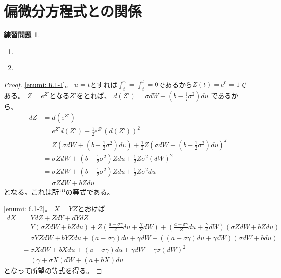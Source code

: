 \documentclass[uplatex]{jsarticle}
\theoremstyle{definition}
\newtheorem{prob}[prob]{練習問題}
\begin{document}
\newpage

\section{偏微分方程式との関係}\label{section: 6}



\begin{prob}\label{prob: 6.1}
  \begin{enumerate}
    \item \label{enumi: 6.1-1}
    \item \label{enumi: 6.1-2}
  \end{enumerate}
\end{prob}

\begin{proof}
  \ref{enumi: 6.1-1}。
  \(u=t\)とすれば\(\int_t^u=\int_t^t=0\)であるから\(Z(t)=e^0=1\)である。
  \(Z=e^{Z'}\)となる\(Z'\)をとれば、
  \(d(Z') = \sigma dW + \left( b-\frac{1}{2}\sigma^2\right) du\)
  であるから、
  \begin{align*}
    dZ &= d(e^{Z'}) \\
    &= e^{Z'}d(Z') + \frac{1}{2}e^{Z'} (d(Z'))^2 \\
    &= Z\left( \sigma dW + \left( b-\frac{1}{2}\sigma^2\right) du \right)
    + \frac{1}{2}Z\left( \sigma dW
    + \left( b-\frac{1}{2}\sigma^2\right) du \right)^2 \\
    &= \sigma Z dW + \left( b-\frac{1}{2}\sigma^2\right) Zdu
    + \frac{1}{2}Z\sigma^2(dW)^2 \\
    &= \sigma Z dW + \left( b-\frac{1}{2}\sigma^2\right) Zdu
    + \frac{1}{2}Z\sigma^2du \\
    &= \sigma ZdW + bZ du
  \end{align*}
  となる。これは所望の等式である。

  \ref{enumi: 6.1-2}。
  \(X=YZ\)とおけば
  \begin{align*}
    dX &= YdZ + ZdY + dYdZ \\
    &= Y\left( \sigma ZdW + bZ du \right)
    + Z\left( \frac{a-\sigma\gamma}{Z}du + \frac{\gamma}{Z}dW \right)
    + \left( \frac{a-\sigma\gamma}{Z}du + \frac{\gamma}{Z}dW \right)
    \left( \sigma ZdW + bZ du \right) \\
    &= \sigma YZdW + bYZ du
    + \left(a-\sigma\gamma\right) du + \gamma dW
    + \left( \left(a-\sigma\gamma \right)du + \gamma dW \right)
    \left( \sigma dW + b du \right) \\
    &= \sigma XdW + bX du
    + \left(a-\sigma\gamma\right) du + \gamma dW
    + \gamma \sigma (dW)^2  \\
    &= (\gamma + \sigma X)dW + (a + bX) du
  \end{align*}
  となって所望の等式を得る。
\end{proof}
\end{document}
